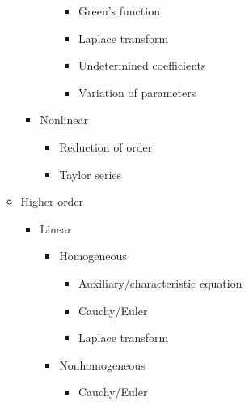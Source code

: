 \documentclass{article}
\begin{document}
\begin{itemize}
\begin{itemize}
\begin{itemize}
\begin{itemize}
\begin{itemize}
                                  \item Green's function

                                  \item Laplace transform

                                  \item Undetermined coefficients

                                  \item Variation of parameters
                                \end{itemize}
                        \end{itemize}

                  \item Nonlinear

                        \begin{itemize}
                          \item Reduction of order

                          \item Taylor series
                        \end{itemize}
                \end{itemize}

          \item Higher order

                \begin{itemize}
                  \item Linear

                        \begin{itemize}
                          \item Homogeneous

                                \begin{itemize}
                                  \item Auxiliary/characteristic equation

                                  \item Cauchy/Euler

                                  \item Laplace transform
                                \end{itemize}

                          \item Nonhomogeneous

                                \begin{itemize}
                                  \item Cauchy/Euler


\end{itemize}
\end{itemize}
\end{itemize}
\end{itemize}
\end{itemize}
\end{document}
